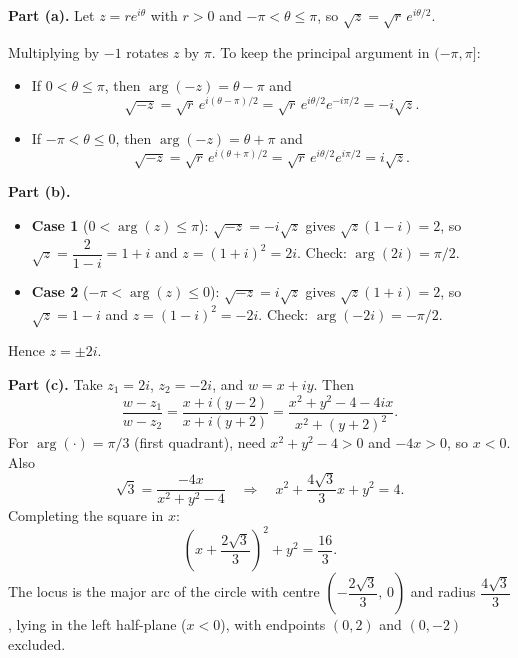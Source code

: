 \begin{solution}
\textbf{Part (a).} Let $z = re^{i\theta}$ with $r > 0$ and $-\pi < \theta \le \pi$, so $\sqrt{z} = \sqrt{r}\,e^{i\theta/2}$.

Multiplying by $-1$ rotates $z$ by $\pi$. To keep the principal argument in $(-\pi,\pi]$:
\begin{itemize}[leftmargin=*]
  \item If $0 < \theta \le \pi$, then $\arg(-z) = \theta - \pi$ and
  \[
  \sqrt{-z} = \sqrt{r}\,e^{i(\theta-\pi)/2}
  = \sqrt{r}\,e^{i\theta/2}e^{-i\pi/2} = -i\sqrt{z}.
  \]
  \item If $-\pi < \theta \le 0$, then $\arg(-z) = \theta + \pi$ and
  \[
  \sqrt{-z} = \sqrt{r}\,e^{i(\theta+\pi)/2}
  = \sqrt{r}\,e^{i\theta/2}e^{i\pi/2} = i\sqrt{z}.
  \]
\end{itemize}

\textbf{Part (b).}
\begin{itemize}[leftmargin=*]
  \item \textbf{Case 1} ($0 < \arg(z) \le \pi$): $\sqrt{-z} = -i\sqrt{z}$ gives $\sqrt{z}(1-i)=2$, so $\sqrt{z} = \dfrac{2}{1-i} = 1+i$ and $z = (1+i)^2 = 2i$. Check: $\arg(2i)=\pi/2$.
  \item \textbf{Case 2} ($-\pi < \arg(z) \le 0$): $\sqrt{-z} = i\sqrt{z}$ gives $\sqrt{z}(1+i)=2$, so $\sqrt{z} = 1-i$ and $z = (1-i)^2 = -2i$. Check: $\arg(-2i)=-\pi/2$.
\end{itemize}
Hence $z = \pm 2i$.

\textbf{Part (c).} Take $z_1 = 2i$, $z_2 = -2i$, and $w = x + iy$. Then
\[
\frac{w-z_1}{w-z_2}
= \frac{x + i(y-2)}{x + i(y+2)}
= \frac{x^2 + y^2 - 4 - 4ix}{x^2 + (y+2)^2}.
\]
For $\arg(\cdot) = \pi/3$ (first quadrant), need $x^2 + y^2 - 4 > 0$ and $-4x > 0$, so $x < 0$. Also
\[
\sqrt{3} = \frac{-4x}{x^2 + y^2 - 4}
\quad\Longrightarrow\quad
x^2 + \frac{4\sqrt{3}}{3}x + y^2 = 4.
\]
Completing the square in $x$:
\[
\left(x + \frac{2\sqrt{3}}{3}\right)^2 + y^2 = \frac{16}{3}.
\]
The locus is the major arc of the circle with centre $\left(-\dfrac{2\sqrt{3}}{3},\,0\right)$ and radius $\dfrac{4\sqrt{3}}{3}$, lying in the left half-plane ($x < 0$), with endpoints $(0,2)$ and $(0,-2)$ excluded.

\vspace{0.5em}
\begin{center}
\end{center}
\end{solution}
